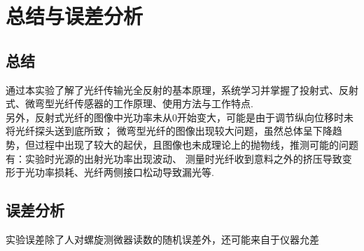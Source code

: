 \documentclass[a4paper]{article}%
\newcommand{\suo}{\indent}%
\begin{document}
\section{总结与误差分析}
\subsection{总结}
通过本实验了解了光纤传输光全反射的基本原理，系统学习并掌握了投射式、反射式、微弯型光纤传感器的工作原理、使用方法与工作特点.\\
\suo 另外，反射式光纤的图像中光功率未从0开始变大，可能是由于调节纵向位移时未将光纤探头送到底所致；
微弯型光纤的图像出现较大问题，虽然总体呈下降趋势，但过程中出现了较大的起伏，且图像也未成理论上的抛物线，推测可能的问题有：实验时光源的出射光功率出现波动、
测量时光纤收到意料之外的挤压导致变形于光功率损耗、光纤两侧接口松动导致漏光等.

\subsection{误差分析}
实验误差除了人对螺旋测微器读数的随机误差外，还可能来自于仪器允差
\end{document}
